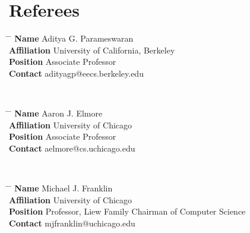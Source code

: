 \documentclass[10pt]{article} %
\begin{document}

\section{Referees}

\parbox{0.5\textwidth}{ %
\begin{tabbing}
\hspace{2cm} \= \hspace{4cm} \= \kill %
{\bf Name} \> Aditya G. Parameswaran \\ %
{\bf Affiliation} \> University of California, Berkeley \\ %
{\bf Position} \> Associate Professor \\ %
{\bf Contact} \> adityagp@eecs.berkeley.edu %
\end{tabbing}}
\\
\parbox{0.5\textwidth}{ %
\begin{tabbing}
\hspace{2cm} \= \hspace{4cm} \= \kill %
{\bf Name} \> Aaron J. Elmore \\ %
{\bf Affiliation} \> University of Chicago \\ %
{\bf Position} \> Associate Professor \\ %
{\bf Contact} \> aelmore@cs.uchicago.edu %
\end{tabbing}}
\\
\parbox{0.5\textwidth}{ %
\begin{tabbing}
\hspace{2cm} \= \hspace{4cm} \= \kill %
{\bf Name} \> Michael J. Franklin \\ %
{\bf Affiliation} \> University of Chicago \\ %
{\bf Position} \> Professor, Liew Family Chairman of Computer Science \\ %
{\bf Contact} \> mjfranklin@uchicago.edu %
\end{tabbing}}
\\
\end{document}
